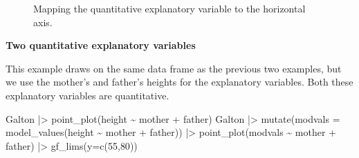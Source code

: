 \documentclass[
  letterpaper,
  DIV=11,
  numbers=noendperiod,
  oneside]{scrartcl}
\newenvironment{Shaded}{\begin{snugshade}}{\end{snugshade}}
\newcommand{\AttributeTok}[1]{\textcolor[rgb]{0.40,0.45,0.13}{#1}}
\newcommand{\DecValTok}[1]{\textcolor[rgb]{0.68,0.00,0.00}{#1}}
\newcommand{\FunctionTok}[1]{\textcolor[rgb]{0.28,0.35,0.67}{#1}}
\newcommand{\NormalTok}[1]{\textcolor[rgb]{0.00,0.23,0.31}{#1}}
\newcommand{\SpecialCharTok}[1]{\textcolor[rgb]{0.37,0.37,0.37}{#1}}
\begin{document}
\begin{figure}[H]


\caption{\label{fig-quant-cat}Mapping the quantitative explanatory
variable to the horizontal axis.}

\end{figure}%

\textbf{Two quantitative explanatory variables}

This example draws on the same data frame as the previous two examples,
but we use the mother's and father's heights for the explanatory
variables. Both these explanatory variables are quantitative.

\begin{Shaded}
\begin{Highlighting}[]
\NormalTok{Galton }\SpecialCharTok{|\textgreater{}} \FunctionTok{point\_plot}\NormalTok{(height }\SpecialCharTok{\textasciitilde{}}\NormalTok{ mother }\SpecialCharTok{+}\NormalTok{ father) }
\NormalTok{Galton }\SpecialCharTok{|\textgreater{}} 
  \FunctionTok{mutate}\NormalTok{(}\AttributeTok{modvals =} 
           \FunctionTok{model\_values}\NormalTok{(height }\SpecialCharTok{\textasciitilde{}}\NormalTok{ mother }\SpecialCharTok{+}\NormalTok{ father)) }\SpecialCharTok{|\textgreater{}}
  \FunctionTok{point\_plot}\NormalTok{(modvals }\SpecialCharTok{\textasciitilde{}}\NormalTok{ mother }\SpecialCharTok{+}\NormalTok{ father) }\SpecialCharTok{|\textgreater{}} 
  \FunctionTok{gf\_lims}\NormalTok{(}\AttributeTok{y=}\FunctionTok{c}\NormalTok{(}\DecValTok{55}\NormalTok{,}\DecValTok{80}\NormalTok{))}
\end{Highlighting}
\end{Shaded}
\end{document}
